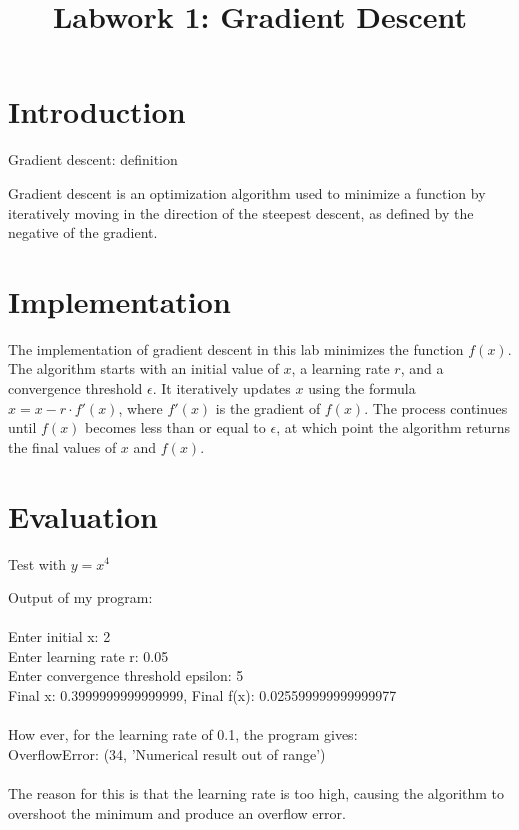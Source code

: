 \documentclass{article}
\title{Labwork 1: Gradient Descent}
\begin{document}
\maketitle

\setlength\parindent{0pt}

\section{Introduction}

Gradient descent: definition

Gradient descent is an optimization algorithm used to minimize a function by iteratively moving in the direction of the steepest descent, as defined by the negative of the gradient.

\section{Implementation}

The implementation of gradient descent in this lab minimizes the function $f(x)$. 
The algorithm starts with an initial value of $x$, a learning rate $r$, and a convergence threshold $\epsilon$. 
It iteratively updates $x$ using the formula $x = x - r \cdot f'(x)$, where $f'(x)$ is the gradient of $f(x)$. 
The process continues until $f(x)$ becomes less than or equal to $\epsilon$, at which point the algorithm returns the final values of $x$ and $f(x)$.

\section{Evaluation}

Test with $y = x^4$

Output of my program:\\
\\
Enter initial x: 2\\
Enter learning rate r: 0.05\\
Enter convergence threshold epsilon: 5\\
Final x: 0.3999999999999999, Final f(x): 0.025599999999999977\\
\\
How ever, for the learning rate of 0.1, the program gives:\\
OverflowError: (34, 'Numerical result out of range')\\
\\
The reason for this is that the learning rate is too high, causing the algorithm to overshoot the minimum and produce an overflow error.
\end{document}
